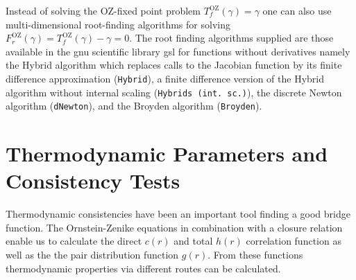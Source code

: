 Instead of solving the OZ-fixed point problem $T^\mathrm{OZ}_f(\gamma)=\gamma$ one can also use multi-dimensional root-finding algorithms for solving $F^\mathrm{OZ}_r(\gamma)=T^\mathrm{OZ}_f(\gamma)-\gamma=0$. The root finding algorithms supplied are those available in the gnu scientific library gsl for functions without derivatives namely the Hybrid algorithm which replaces calls to the Jacobian function by its finite difference approximation (\texttt{Hybrid}), a finite difference version of the Hybrid algorithm without internal scaling (\texttt{Hybrids (int. sc.)}), the discrete Newton algorithm (\texttt{dNewton}), and the Broyden algorithm (\texttt{Broyden}).


\section{Thermodynamic Parameters and Consistency Tests}

Thermodynamic consistencies have been an important tool finding a good bridge function.
The Ornstein-Zenike equations in combination with a closure relation enable us to calculate
the direct $c(r)$ and total $h(r)$ correlation function  as well as the the pair distribution function $g(r)$.
From these functions thermodynamic properties via different routes can be calculated.

